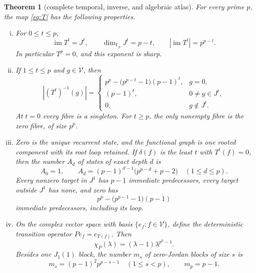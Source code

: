 \documentclass[a4paper,10pt]{amsart}
\newtheorem{theorem}{Theorem}
\theoremstyle{remark}
\newcommand{\F}{\mathbb F}
\newcommand{\cV}{\mathcal V}
\newcommand{\im}{\operatorname{im}}
\begin{document}
\begin{theorem}[complete temporal, inverse, and algebraic atlas]\label{thm:atlas}
For every prime $p$, the map \eqref{eq:T} has the following properties.
\begin{enumerate}[(i)]
\item For $0\le t\le p$,
\begin{equation}\label{eq:image}
       \im T^t=J^t,\qquad \dim_{\F_p}J^t=p-t,\qquad
       |\im T^t|=p^{p-t}.
\end{equation}
In particular $T^p=0$, and this exponent is sharp.

\item If $1\le t\le p$ and $g\in\cV$, then
\begin{equation}\label{eq:fibres}
 |(T^t)^{-1}(g)|=
 \begin{cases}
 p^p-\bigl(p^{p-t}-1\bigr)(p-1)^t,&g=0,\\
 (p-1)^t,&0\ne g\in J^t,\\
 0,&g\notin J^t.
 \end{cases}
\end{equation}
At $t=0$ every fibre is a singleton.  For $t\ge p$, the only
nonempty fibre is the zero fibre, of size $p^p$.

\item Zero is the unique recurrent state, and the functional graph is one
rooted component with its root loop retained.  If $\delta(f)$ is the least
$t$ with $T^t(f)=0$, then the number $A_d$ of states of exact depth $d$ is
\begin{equation}\label{eq:depth}
 A_0=1,\qquad
 A_d=(p-1)^{d-1}\bigl(p^{p-d}+p-2\bigr)
 \quad(1\le d\le p).
\end{equation}
Every nonzero target in $J^1$ has $p-1$ immediate predecessors, every
target outside $J^1$ has none, and zero has
\begin{equation}\label{eq:rootdegree}
             p^p-\bigl(p^{p-1}-1\bigr)(p-1)
\end{equation}
immediate predecessors, including its loop.

\item On the complex vector space with basis $\{e_f:f\in\cV\}$, define the
deterministic transition operator $P e_f=e_{T(f)}$.  Then
\begin{equation}\label{eq:charpoly}
                   \chi_P(\lambda)=(\lambda-1)\lambda^{p^p-1}.
\end{equation}
Besides one $J_1(1)$ block, the number $m_s$ of zero-Jordan blocks of
size $s$ is
\begin{equation}\label{eq:jordan}
 m_s=(p-1)^2p^{p-s-1}\quad(1\le s<p),
 \qquad m_p=p-1.
\end{equation}
\end{enumerate}
\end{theorem}
\end{document}
